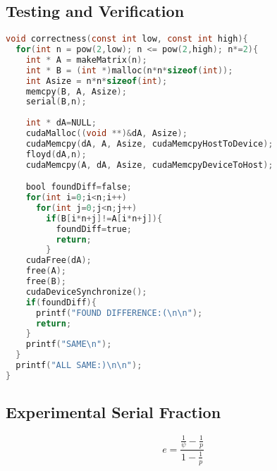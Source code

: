 \documentclass[12pt]{article}
\begin{document}
\subsection*{Testing and Verification}
\begin{lstlisting}[frame=single,language=C,caption=CUDA Correctness Testing \label{code:make}]
void correctness(const int low, const int high){
  for(int n = pow(2,low); n <= pow(2,high); n*=2){
    int * A = makeMatrix(n);
    int * B = (int *)malloc(n*n*sizeof(int));
    int Asize = n*n*sizeof(int);
    memcpy(B, A, Asize);
    serial(B,n);
    
    int * dA=NULL;
    cudaMalloc((void **)&dA, Asize);
    cudaMemcpy(dA, A, Asize, cudaMemcpyHostToDevice);
    floyd(dA,n);
    cudaMemcpy(A, dA, Asize, cudaMemcpyDeviceToHost);

    bool foundDiff=false;
    for(int i=0;i<n;i++)
      for(int j=0;j<n;j++)
        if(B[i*n+j]!=A[i*n+j]){
          foundDiff=true;
          return;
        }
    cudaFree(dA);
    free(A);
    free(B);
    cudaDeviceSynchronize();
    if(foundDiff){
      printf("FOUND DIFFERENCE:(\n\n");
      return;
    }
    printf("SAME\n");
  }
  printf("ALL SAME:)\n\n");
}
\end{lstlisting}

\newpage
\subsection*{Experimental Serial Fraction}
\[
  e= \frac{\frac{1}{\psi}-\frac{1}{p}}{1-\frac{1}{p}}
\]
\end{document}
